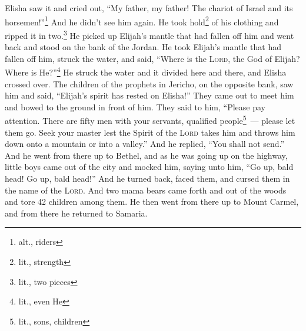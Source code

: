 \begin{inparaenum}
     Elisha saw it and cried out, ``My father, my father! The chariot of Israel and its horsemen!''\footnote{alt., riders} And he didn't see him again. He took hold\footnote{lit., strength} of his clothing and ripped it in two.\footnote{lit., two pieces}%
     He picked up Elijah's mantle that had fallen off him and went back and stood on the bank of the Jordan.%
     He took Elijah's mantle that had fallen off him, struck the water, and said, ``Where is the \textsc{Lord}, the God of Elijah? Where is He?''\footnote{lit., even He} He struck the water and it divided here and there, and Elisha crossed over.%
     The children of the prophets in Jericho, on the opposite bank, saw him and said, ``Elijah's spirit has rested on Elisha!'' They came out to meet him and bowed to the ground in front of him.%
     They said to him, ``Please pay attention. There are fifty men with your servants, qualified people\footnote{lit., sons, children}~--- please let them go. Seek your master lest the Spirit of the \textsc{Lord} takes him and throws him down onto a mountain or into a valley.'' And he replied, ``You shall not send.''%
     And he went from there up to Bethel, and as he was going up on the highway, little boys came out of the city and mocked him, saying unto him, ``Go up, bald head! Go up, bald head!''%
     And he turned back, faced them, and cursed them in the name of the \textsc{Lord}. And two mama bears came forth and out of the woods and tore 42 children among them.%
     He then went from there up to Mount Carmel, and from there he returned to Samaria.%
\end{inparaenum}
